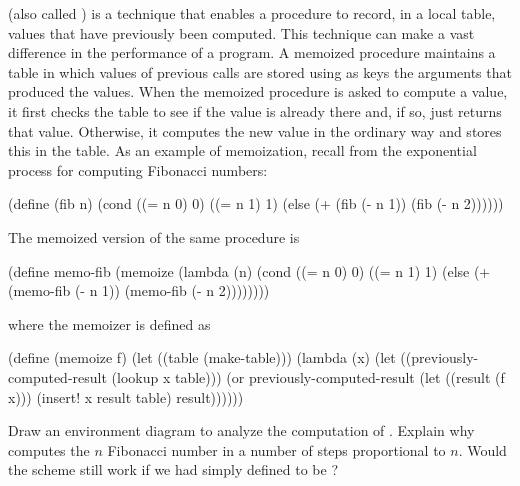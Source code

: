 \begin{exercise}
	\label{Exercise 3.27}
	 (also called ) is a technique that enables a procedure to record, in a local table, values that have previously been computed.
	This technique can make a vast difference in the performance of a program.
	A memoized procedure maintains a table in which values of previous calls are stored using as keys the arguments that produced the values.
	When the memoized procedure is asked to compute a value, it first checks the table to see if the value is already there and, if so, just returns that value.
	Otherwise, it computes the new value in the ordinary way and stores this in the table.
	As an example of memoization, recall from  the exponential process for computing Fibonacci numbers:
	\begin{scheme}
	  (define (fib n)
	    (cond ((= n 0) 0)
	          ((= n 1) 1)
	          (else (+ (fib (- n 1)) (fib (- n 2))))))
	\end{scheme}
	The memoized version of the same procedure is
	\begin{scheme}
	  (define memo-fib
	    (memoize
	     (lambda (n)
	       (cond ((= n 0) 0)
	             ((= n 1) 1)
	             (else (+ (memo-fib (- n 1))
	                      (memo-fib (- n 2))))))))
	\end{scheme}
	where the memoizer is defined as
	\begin{scheme}
	  (define (memoize f)
	    (let ((table (make-table)))
	      (lambda (x)
	        (let ((previously-computed-result
	               (lookup x table)))
	          (or previously-computed-result
	              (let ((result (f x)))
	                (insert! x result table)
	                result))))))
	\end{scheme}
	Draw an environment diagram to analyze the computation of .
	Explain why  computes the \( n \) Fibonacci number in a number of steps proportional to \( n \).
	Would the scheme still work if we had simply defined  to be ?
\end{exercise}
